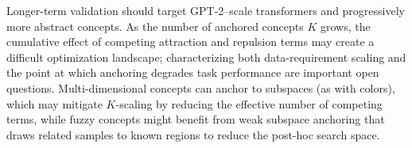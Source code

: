 Longer-term validation should target GPT-2--scale transformers and progressively
more abstract concepts. As the number of anchored concepts $K$ grows, the
cumulative effect of competing attraction and repulsion terms may create a
difficult optimization landscape; characterizing both data-requirement scaling
and the point at which anchoring degrades task performance are important open
questions. Multi-dimensional concepts can anchor to subspaces (as with
 colors), which may mitigate $K$-scaling by reducing the
effective number of competing terms, while fuzzy concepts might benefit from
weak subspace anchoring that draws related samples to known regions to reduce
the post-hoc search space.
